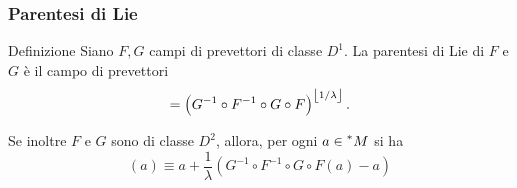 \documentclass{beamer}
\newenvironment{definizioneb}{\begin{block}{Definizione}}{\end{block}}
\newenvironment{teoremab}{\begin{alertblock}{Teorema}}{\end{alertblock}}
\begin{document}
\begin{frame}
    \frametitle{Parentesi di Lie}

    \begin{definizioneb}
        Siano $ F,G $ campi di prevettori di classe $ D^{1} $. La parentesi di Lie di $ F $ e $ G $ è il campo di prevettori \begin{equation*}
            [F,G] = \left(G^{-1}\circ F^{-1}\circ G\circ F\right)^{\floor{1/\lambda}}.
        \end{equation*}
    \end{definizioneb}

    Se inoltre $ F $ e $ G $ sono di classe $ D^{2} $, allora, per ogni $ a \in \prescript{*}{}{M} $ si ha \begin{equation*}
        [F,G](a) \equiv a + \frac{1}{\lambda} \left(G^{-1}\circ F^{-1}\circ G\circ F(a)-a\right)
    \end{equation*}



\end{frame}
\end{document}
